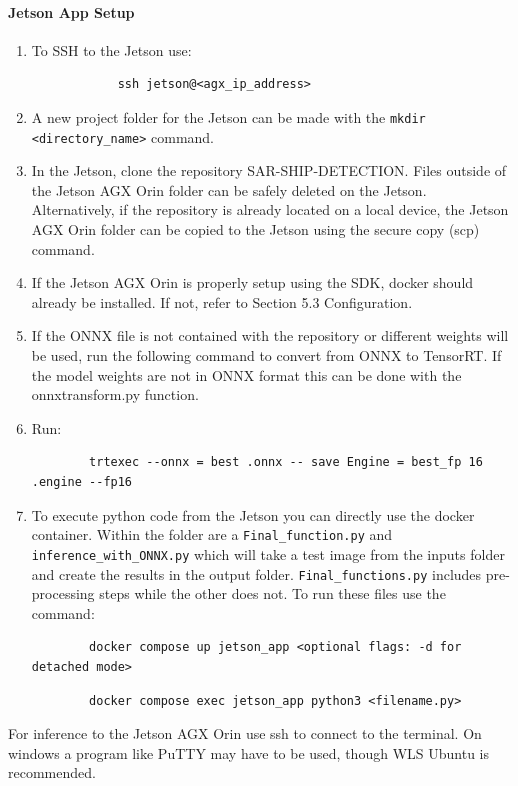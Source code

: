\documentclass{article}
\begin{document}
	\paragraph{Jetson App Setup}
	\begin{enumerate}
		\item To SSH to the Jetson use: 
		\begin{lstlisting}
			ssh jetson@<agx_ip_address>
		\end{lstlisting}
		\item A new project folder for the Jetson can be made with the \texttt{mkdir <directory\_name>} command.
		
		\item In the Jetson, clone the repository SAR-SHIP-DETECTION. Files outside of the Jetson AGX Orin folder can be safely deleted on the Jetson. Alternatively, if the repository is already located on a local device, the Jetson AGX Orin folder can be copied to the Jetson using the secure copy (scp) command.
		
		\item If the Jetson AGX Orin is properly setup using the SDK, docker should already be installed. If not, refer to Section 5.3 Configuration. 
		
		\item If the ONNX file is not contained with the repository or different weights will be used, run the following command to convert from ONNX to TensorRT. If the model weights are not in ONNX format this can be done with the onnxtransform.py function.
		
		\item Run:\begin{lstlisting}
		trtexec --onnx = best .onnx -- save Engine = best_fp 16 .engine --fp16
		\end{lstlisting}
		
		\item To execute python code from the Jetson you can directly use the docker container. Within the folder are a \texttt{Final\_function.py} and \texttt{inference\_with\_ONNX.py} which will take a test image from the inputs folder and create the results in the output folder. 
		\texttt{Final\_functions.py} includes pre-processing steps while the other does not. To run these files use the command:
		\begin{lstlisting}
		docker compose up jetson_app <optional flags: -d for detached mode>
		\end{lstlisting}
		
		\begin{lstlisting}
		docker compose exec jetson_app python3 <filename.py>
		\end{lstlisting}
	\end{enumerate}
	For inference to the Jetson AGX Orin use ssh to connect to the terminal. On windows a program like PuTTY may have to be used, though WLS Ubuntu is recommended. \\
	
\end{document}
